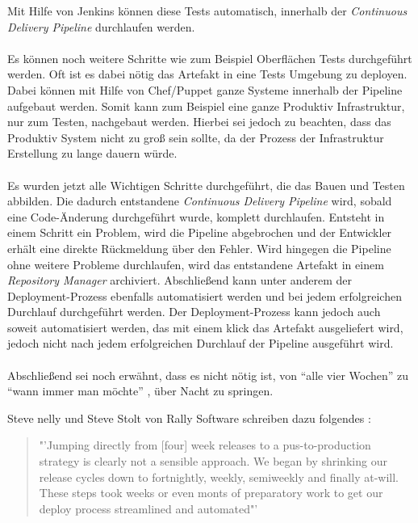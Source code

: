 Mit Hilfe von Jenkins können diese Tests automatisch, innerhalb der \textit{Continuous Delivery Pipeline} durchlaufen werden.
\\\\
Es können noch weitere Schritte wie zum Beispiel Oberflächen Tests durchgeführt werden. Oft ist es dabei nötig das Artefakt in eine Tests Umgebung zu deployen. Dabei können mit Hilfe von Chef/Puppet ganze Systeme innerhalb der Pipeline aufgebaut werden. Somit kann zum Beispiel eine ganze Produktiv Infrastruktur, nur zum Testen, nachgebaut werden. Hierbei sei jedoch zu beachten, dass das Produktiv System nicht zu groß sein sollte, da der Prozess der Infrastruktur Erstellung zu lange dauern würde.
\\\\
Es wurden jetzt alle Wichtigen Schritte durchgeführt, die das Bauen und Testen abbilden. Die dadurch entstandene \textit{Continuous Delivery Pipeline} wird, sobald eine Code-Änderung durchgeführt wurde, komplett durchlaufen. Entsteht in einem Schritt ein Problem, wird die Pipeline abgebrochen und der Entwickler erhält eine direkte Rückmeldung über den Fehler. Wird hingegen die Pipeline ohne weitere Probleme durchlaufen, wird das entstandene Artefakt in einem \textit{Repository Manager} archiviert. Abschließend kann unter anderem der Deployment-Prozess ebenfalls automatisiert werden und bei jedem erfolgreichen Durchlauf durchgeführt werden. Der Deployment-Prozess kann jedoch auch soweit automatisiert werden, das mit einem klick das Artefakt ausgeliefert wird, jedoch nicht nach jedem erfolgreichen Durchlauf der Pipeline ausgeführt wird.
\\\\
Abschließend sei noch erwähnt, dass es nicht nötig ist, von "`alle vier Wochen"' zu "`wann immer man möchte"' , über Nacht zu springen.

Steve nelly und Steve Stolt von Rally Software schreiben dazu folgendes\cite{RallySofware2013} :
\begin{quote}
    "'Jumping directly from [four] week releases to a pus-to-production strategy is clearly not a sensible approach. We began by shrinking our release cycles down to fortnightly, weekly, semiweekly and finally at-will. These steps took weeks or even monts of preparatory work to get our deploy process streamlined and automated"'\cite[You do not have to go from eight to zero overnight]{RallySofware2013}
\end{quote}